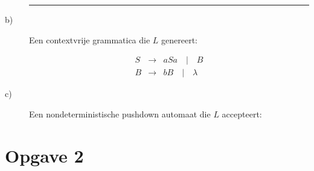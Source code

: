 \documentclass[a4paper,11pt]{article}
\begin{document}
\begin{description}
\hfill\rule{2.1mm}{2.mm}


\item[b)]

Een contextvrije grammatica die $L$ genereert:

\begin{eqnarray*}
S & \rightarrow & a S a \quad | \quad B \\
B & \rightarrow & bB \quad | \quad \lambda
\end{eqnarray*}


\item[c)]

Een nondeterministische pushdown automaat die $L$ accepteert:\\[1em]




\end{description}


\section*{Opgave 2}
\end{document}
